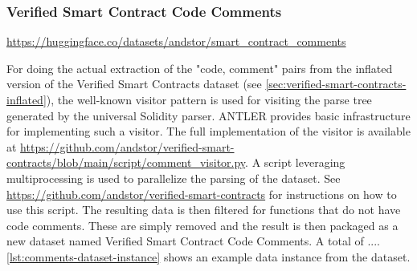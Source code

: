 \subsubsection{Verified Smart Contract Code Comments}
\label{sec:verified-smart-contracts-comments}
\url{https://huggingface.co/datasets/andstor/smart_contract_comments}

For doing the actual extraction of the "code, comment" pairs from the inflated version of the Verified Smart Contracts dataset (see \cref{sec:verified-smart-contracts-inflated}), the well-known visitor pattern \cite{visitor-pattern} is used for visiting the parse tree generated by the universal Solidity parser. ANTLER provides basic infrastructure for implementing such a visitor. The full implementation of the visitor is available at \url{https://github.com/andstor/verified-smart-contracts/blob/main/script/comment_visitor.py}. A script leveraging multiprocessing is used to parallelize the parsing of the dataset. See \url{https://github.com/andstor/verified-smart-contracts} for instructions on how to use this script. The resulting data is then filtered for functions that do not have code comments. These are simply removed and the result is then packaged as a new dataset named Verified Smart Contract Code Comments. A total of .... \cref{lst:comments-dataset-instance} shows an example data instance from the dataset.



